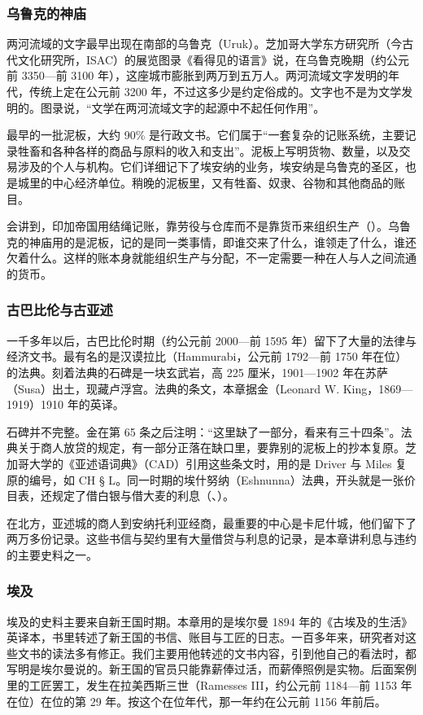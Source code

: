 \subsubsection{乌鲁克的神庙}
两河流域的文字最早出现在南部的乌鲁克（Uruk）。芝加哥大学东方研究所（今古代文化研究所，ISAC）的展览图录《看得见的语言》说，在乌鲁克晚期（约公元前 3350—前 3100 年），这座城市膨胀到两万到五万人。两河流域文字发明的年代，传统上定在公元前 3200 年，不过这多少是约定俗成的\cite{woods2010}。文字也不是为文学发明的。图录说，“文学在两河流域文字的起源中不起任何作用”。

最早的一批泥板，大约 90\% 是行政文书。它们属于“一套复杂的记账系统，主要记录牲畜和各种各样的商品与原料的收入和支出”。泥板上写明货物、数量，以及交易涉及的个人与机构。它们详细记下了埃安纳的业务，埃安纳是乌鲁克的圣区，也是城里的中心经济单位\cite{woods2010}。稍晚的泥板里，又有牲畜、奴隶、谷物和其他商品的账目\cite{woods2010}。

会讲到，印加帝国用结绳记账，靠劳役与仓库而不是靠货币来组织生产（）。乌鲁克的神庙用的是泥板，记的是同一类事情，即谁交来了什么，谁领走了什么，谁还欠着什么。这样的账本身就能组织生产与分配，不一定需要一种在人与人之间流通的货币。

\subsubsection{古巴比伦与古亚述}
一千多年以后，古巴比伦时期（约公元前 2000—前 1595 年）\cite{woods2010}留下了大量的法律与经济文书。最有名的是汉谟拉比（Hammurabi，公元前 1792—前 1750 年在位）的法典。刻着法典的石碑是一块玄武岩，高 225 厘米，1901—1902 年在苏萨（Susa）出土，现藏卢浮宫\cite{louvre_sb8}。法典的条文，本章据金（Leonard W. King，1869—1919）1910 年的英译\cite{king1910}。

石碑并不完整。金在第 65 条之后注明：“这里缺了一部分，看来有三十四条”\cite{king1910}。法典关于商人放贷的规定，有一部分正落在缺口里，要靠别的泥板上的抄本复原。芝加哥大学的《亚述语词典》（CAD）引用这些条文时，用的是 Driver 与 Miles 复原的编号，如 CH § L\cite{cad_s}。同一时期的埃什努纳（Eshnunna）法典，开头就是一张价目表，还规定了借白银与借大麦的利息（、）。

在北方，亚述城的商人到安纳托利亚经商，最重要的中心是卡尼什城，他们留下了两万多份记录\cite{woods2010}。这些书信与契约里有大量借贷与利息的记录，是本章讲利息与违约的主要史料之一。

\subsubsection{埃及}
埃及的史料主要来自新王国时期。本章用的是埃尔曼 1894 年的《古埃及的生活》英译本\cite{erman1894}，书里转述了新王国的书信、账目与工匠的日志。一百多年来，研究者对这些文书的读法多有修正。我们主要用他转述的文书内容，引到他自己的看法时，都写明是埃尔曼说的。新王国的官员只能靠薪俸过活，而薪俸照例是实物\cite{erman1894}。后面案例里的工匠罢工，发生在拉美西斯三世（Ramesses III，约公元前 1184—前 1153 年在位）\cite{teeter2024}在位的第 29 年。按这个在位年代，那一年约在公元前 1156 年前后。

